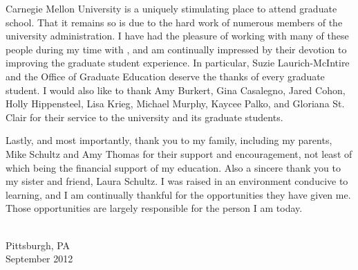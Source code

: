 Carnegie Mellon University is a uniquely stimulating place to attend 
graduate school. That it remains so is due to the hard work of numerous 
members of the university administration. I have had the pleasure of 
working with many of these people during my time with , and am 
continually impressed by their devotion to improving the graduate student 
experience. In particular, Suzie Laurich-McIntire and the Office of 
Graduate Education deserve the thanks of every graduate student. I would 
also like to thank Amy Burkert, Gina Casalegno, Jared Cohon, Holly 
Hippensteel, Lisa Krieg, Michael Murphy, Kaycee Palko, and Gloriana St. 
Clair for their service to the university and its graduate students.

Lastly, and most importantly, thank you to my family, including my 
parents, Mike Schultz and Amy Thomas for their support and encouragement, 
not least of which being the financial support of my education. Also a 
sincere thank you to my sister and friend, Laura Schultz. I was raised in 
an environment conducive to learning, and I am continually thankful for
the opportunities they have given me. Those opportunities are largely 
responsible for the person I am today.


{ \\ Pittsburgh, PA \\ September 2012\par}
